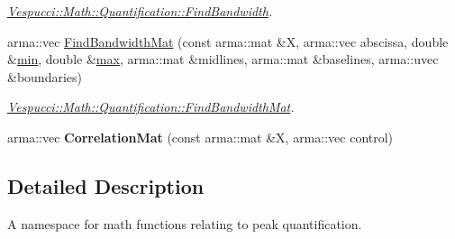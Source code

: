 \begin{DoxyCompactItemize}
\begin{DoxyCompactList}\small\item\em \hyperlink{namespace_vespucci_1_1_math_1_1_quantification_a9ae95323be0190407aac32ec87605352}{Vespucci\+::\+Math\+::\+Quantification\+::\+Find\+Bandwidth}. \end{DoxyCompactList}\item 
arma\+::vec \hyperlink{namespace_vespucci_1_1_math_1_1_quantification_a1f48a5ba0518572ef75a81985a267265}{Find\+Bandwidth\+Mat} (const arma\+::mat \&X, arma\+::vec abscissa, double \&\hyperlink{namespace_vespucci_1_1_math_a884dc00603c6aed8e2ee23988c429c64}{min}, double \&\hyperlink{namespace_vespucci_1_1_math_a3d8f536b4465a4bacce89a51e3854daf}{max}, arma\+::mat \&midlines, arma\+::mat \&baselines, arma\+::uvec \&boundaries)
\begin{DoxyCompactList}\small\item\em \hyperlink{namespace_vespucci_1_1_math_1_1_quantification_a1f48a5ba0518572ef75a81985a267265}{Vespucci\+::\+Math\+::\+Quantification\+::\+Find\+Bandwidth\+Mat}. \end{DoxyCompactList}\item 
\hypertarget{namespace_vespucci_1_1_math_1_1_quantification_a47990289613d7074bbd7d769b5647ff4}{arma\+::vec {\bfseries Correlation\+Mat} (const arma\+::mat \&X, arma\+::vec control)}\label{namespace_vespucci_1_1_math_1_1_quantification_a47990289613d7074bbd7d769b5647ff4}

\end{DoxyCompactItemize}


\subsection{Detailed Description}
A namespace for math functions relating to peak quantification. 

